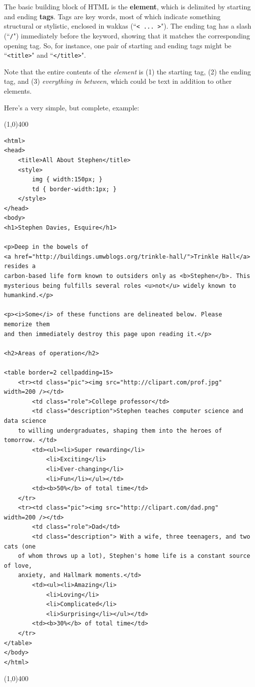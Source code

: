 \documentclass[12pt]{article}
\begin{document}
The basic building block of HTML is the \textbf{element}, which is delimited
by starting and ending \textbf{tags}. Tags are key words, most of which
indicate something structural or stylistic, enclosed in wakkas (``\texttt{<
... >}"). The ending tag has a slash (``\texttt{/}") immediately before the
keyword, showing that it matches the corresponding opening tag. So, for
instance, one pair of starting and ending tags might be ``\texttt{<title>}"
and ``\texttt{</title>}".

Note that the entire contents of the \textit{element} is (1) the starting tag,
(2) the ending tag, and (3) \textit{everything in between}, which could be
text in addition to other elements.

\vspace{.2in}
\pagebreak
Here's a very simple, but complete, example:

\line(1,0){400}
\scriptsize
\begin{Verbatim}[fontsize=\small,samepage=true,frame=none]
<html>
<head>
    <title>All About Stephen</title>
    <style>
        img { width:150px; }
        td { border-width:1px; }
    </style>
</head>
<body>
<h1>Stephen Davies, Esquire</h1>

<p>Deep in the bowels of
<a href="http://buildings.umwblogs.org/trinkle-hall/">Trinkle Hall</a> resides a
carbon-based life form known to outsiders only as <b>Stephen</b>. This
mysterious being fulfills several roles <u>not</u> widely known to
humankind.</p>

<p><i>Some</i> of these functions are delineated below. Please memorize them
and then immediately destroy this page upon reading it.</p>

<h2>Areas of operation</h2>

<table border=2 cellpadding=15>
    <tr><td class="pic"><img src="http://clipart.com/prof.jpg" width=200 /></td>
        <td class="role">College professor</td>
        <td class="description">Stephen teaches computer science and data science
    to willing undergraduates, shaping them into the heroes of tomorrow. </td>
        <td><ul><li>Super rewarding</li>
            <li>Exciting</li>
            <li>Ever-changing</li>
            <li>Fun</li></ul></td>
        <td><b>50%</b> of total time</td>
    </tr>
    <tr><td class="pic"><img src="http://clipart.com/dad.png" width=200 /></td>
        <td class="role">Dad</td>
        <td class="description"> With a wife, three teenagers, and two cats (one
    of whom throws up a lot), Stephen's home life is a constant source of love,
    anxiety, and Hallmark moments.</td>
        <td><ul><li>Amazing</li>
            <li>Loving</li>
            <li>Complicated</li>
            <li>Surprising</li></ul></td>
        <td><b>30%</b> of total time</td>
    </tr>
</table>
</body>
</html>
\end{Verbatim}
\line(1,0){400}
\normalsize
\end{document}
